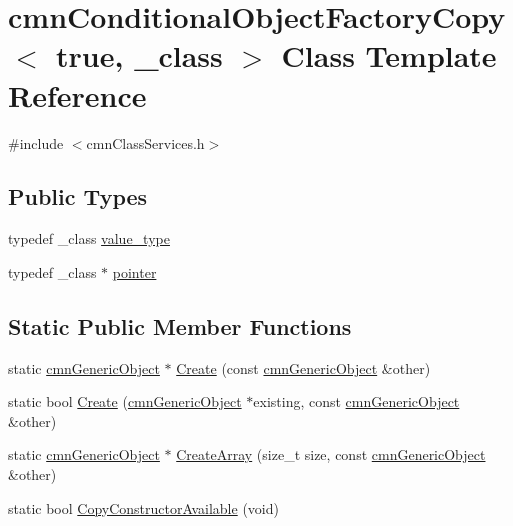 \hypertarget{classcmn_conditional_object_factory_copy_3_01true_00_01__class_01_4}{\section{cmn\-Conditional\-Object\-Factory\-Copy$<$ true, \-\_\-class $>$ Class Template Reference}
\label{classcmn_conditional_object_factory_copy_3_01true_00_01__class_01_4}
}


{\ttfamily \#include $<$cmn\-Class\-Services.\-h$>$}

\subsection*{Public Types}
\begin{DoxyCompactItemize}
\item 
typedef \-\_\-class \hyperlink{classcmn_conditional_object_factory_copy_3_01true_00_01__class_01_4_ad1492fd9e525d85f29807a26148f082e}{value\-\_\-type}
\item 
typedef \-\_\-class $\ast$ \hyperlink{classcmn_conditional_object_factory_copy_3_01true_00_01__class_01_4_af5fd377a8880cde0f6579e8e35a3d3ef}{pointer}
\end{DoxyCompactItemize}
\subsection*{Static Public Member Functions}
\begin{DoxyCompactItemize}
\item 
static \hyperlink{classcmn_generic_object}{cmn\-Generic\-Object} $\ast$ \hyperlink{classcmn_conditional_object_factory_copy_3_01true_00_01__class_01_4_a16e0c048ea5e29abdbb214bc575c4f4e}{Create} (const \hyperlink{classcmn_generic_object}{cmn\-Generic\-Object} \&other)
\item 
static bool \hyperlink{classcmn_conditional_object_factory_copy_3_01true_00_01__class_01_4_a88854dd733e90c4a67e242043957e84b}{Create} (\hyperlink{classcmn_generic_object}{cmn\-Generic\-Object} $\ast$existing, const \hyperlink{classcmn_generic_object}{cmn\-Generic\-Object} \&other)
\item 
static \hyperlink{classcmn_generic_object}{cmn\-Generic\-Object} $\ast$ \hyperlink{classcmn_conditional_object_factory_copy_3_01true_00_01__class_01_4_a919c8d5ca3b5d10a80c9e95d6e2ef12f}{Create\-Array} (size\-\_\-t size, const \hyperlink{classcmn_generic_object}{cmn\-Generic\-Object} \&other)
\item 
static bool \hyperlink{classcmn_conditional_object_factory_copy_3_01true_00_01__class_01_4_a38e1bcf7aa8f422a4d1b2128494dbe61}{Copy\-Constructor\-Available} (void)
\end{DoxyCompactItemize}


